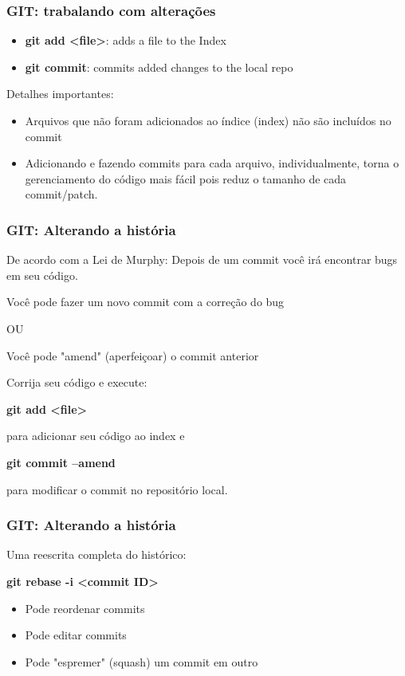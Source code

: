 \documentclass{beamer}
\begin{document}
\begin{frame}
\frametitle{GIT: trabalando com alterações}


\begin{itemize}
\item \textbf{git add <file>}: adds a file to the Index
\item \textbf{git commit}:  commits added changes to the local repo
\end{itemize}

Detalhes importantes:

\begin{itemize}
\item Arquivos que não foram adicionados ao índice (index) não são incluídos no commit
\item Adicionando e fazendo commits para cada arquivo, individualmente, torna o gerenciamento do código mais fácil pois reduz o tamanho de cada commit/patch.
\end{itemize}

\end{frame}

\begin{frame}
\frametitle{GIT: Alterando a história}

De acordo com a Lei de Murphy: Depois de um commit você irá encontrar bugs em seu código.

Você pode fazer um novo commit com a correção do bug

OU 

Você pode "amend" (aperfeiçoar) o commit anterior

Corrija seu código e execute:

\textbf{git add <file>}

para adicionar seu código ao index e

\textbf{git commit --amend}

para modificar o commit no repositório local.
\end{frame}


\begin{frame}
\frametitle{GIT: Alterando a história}

Uma reescrita completa do histórico:

\textbf{git rebase -i <commit ID>}

\begin{itemize}
\item Pode reordenar commits
\item Pode editar commits
\item Pode "espremer" (squash) um commit em outro
\end{itemize}


\end{frame}
\end{document}
